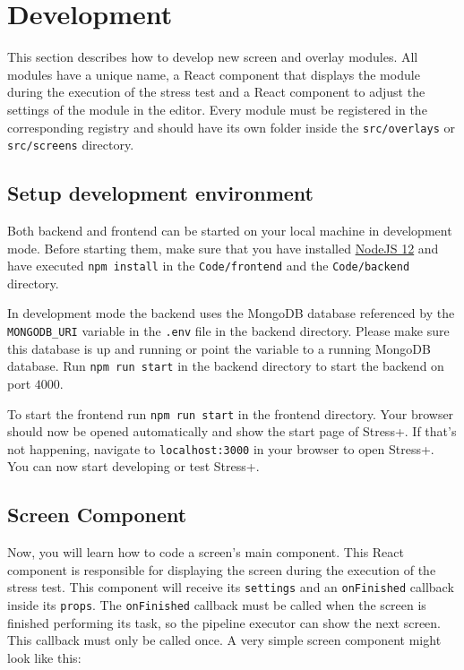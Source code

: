 \section{Development}
\label{sec:development}

This section describes how to develop new screen and overlay modules.
All modules have a unique name, a React component that displays the module during the execution of the stress test and a React component to adjust the settings of the module in the editor. 
Every module must be registered in the corresponding registry and should have its own folder inside the \texttt{src/overlays} or \texttt{src/screens} directory.

\subsection{Setup development environment}
Both backend and frontend can be started on your local machine in development mode.
Before starting them, make sure that you have installed \href{https://nodejs.org}{NodeJS 12} and have executed \texttt{npm install} in the \texttt{Code/frontend} and the \texttt{Code/backend} directory.

In development mode the backend uses the MongoDB database referenced by the \texttt{MONGODB\_URI} variable in the \texttt{.env} file in the backend directory.
Please make sure this database is up and running or point the variable to a running MongoDB database.
Run \texttt{npm run start} in the backend directory to start the backend on port $4000$.

To start the frontend run \texttt{npm run start} in the frontend directory.
Your browser should now be opened automatically and show the start page of Stress+.
If that's not happening, navigate to \texttt{localhost:3000} in your browser to open Stress+.
You can now start developing or test Stress+.

\subsection{Screen Component}
\label{sec:development-screens}

Now, you will learn how to code a screen's main component. 
This React component is responsible for displaying the screen during the execution of the stress test.
This component will receive its \texttt{settings} and an \texttt{onFinished} callback inside its \texttt{props}. 
The \texttt{onFinished} callback must be called when the screen is finished performing its task, so the pipeline executor can show the next screen. 
This callback must only be called once. 
A very simple screen component might look like this:

